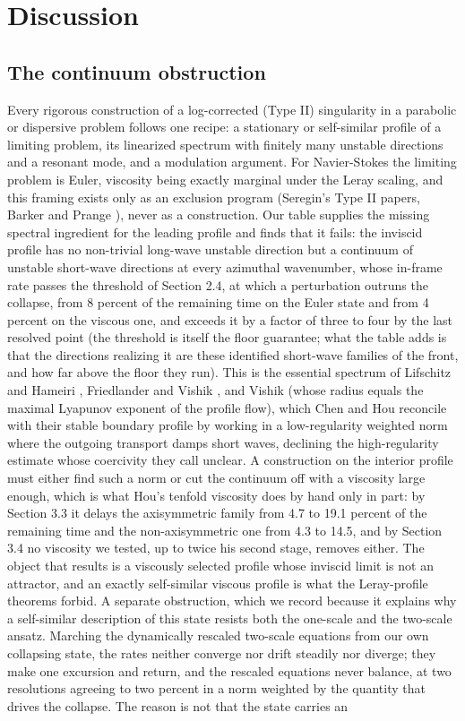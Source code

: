 \documentclass[11pt]{article}
\begin{document}
\section{Discussion}

\subsection{The continuum obstruction}

Every rigorous construction of a log-corrected (Type II) singularity in a parabolic or dispersive problem follows one recipe: a stationary or self-similar profile of a limiting problem, its linearized spectrum with finitely many unstable directions and a resonant mode, and a modulation argument. For Navier-Stokes the limiting problem is Euler, viscosity being exactly marginal under the Leray scaling, and this framing exists only as an exclusion program (Seregin's Type II papers, Barker and Prange \cite{BP20,BP21}), never as a construction. Our table supplies the missing spectral ingredient for the leading profile and finds that it fails: the inviscid profile has no non-trivial long-wave unstable direction but a continuum of unstable short-wave directions at every azimuthal wavenumber, whose in-frame rate passes the threshold of Section 2.4, at which a perturbation outruns the collapse, from 8 percent of the remaining time on the Euler state and from 4 percent on the viscous one, and exceeds it by a factor of three to four by the last resolved point (the threshold is itself the floor \cite{VV20,LVV21} guarantee; what the table adds is that the directions realizing it are these identified short-wave families of the front, and how far above the floor they run). This is the essential spectrum of Lifschitz and Hameiri \cite{LH91}, Friedlander and Vishik \cite{FV91}, and Vishik \cite{V96} (whose radius equals the maximal Lyapunov exponent of the profile flow), which Chen and Hou reconcile with their stable boundary profile by working in a low-regularity weighted norm where the outgoing transport damps short waves, declining the high-regularity estimate whose coercivity they call unclear. A construction on the interior profile must either find such a norm or cut the continuum off with a viscosity large enough, which is what Hou's tenfold viscosity does by hand only in part: by Section 3.3 it delays the axisymmetric family from 4.7 to 19.1 percent of the remaining time and the non-axisymmetric one from 4.3 to 14.5, and by Section 3.4 no viscosity we tested, up to twice his second stage, removes either. The object that results is a viscously selected profile whose inviscid limit is not an attractor, and an exactly self-similar viscous profile is what the Leray-profile theorems forbid. A separate obstruction, which we record because it explains why a self-similar description of this state resists both the one-scale and the two-scale ansatz. Marching the dynamically rescaled two-scale equations from our own collapsing state, the rates neither converge nor drift steadily nor diverge; they make one excursion and return, and the rescaled equations never balance, at two resolutions agreeing to two percent in a norm weighted by the quantity that drives the collapse. The reason is not that the state carries an 
\end{document}
